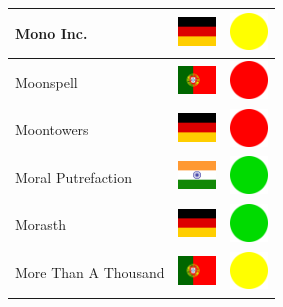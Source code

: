 \documentclass[12pt, a4paper, twoside]{report}
\begin{document}
\begin{center}
\begin{longtable}{|p{5cm}|p{2cm}|p{2cm}|}
Mono Inc. & \includegraphics[width=1cm]{4x3/de} & \includegraphics[width=1cm]{likes/m} \\ \hline
Moonspell & \includegraphics[width=1cm]{4x3/pt} & \includegraphics[width=1cm]{likes/n} \\ \hline
Moontowers & \includegraphics[width=1cm]{4x3/de} & \includegraphics[width=1cm]{likes/n} \\ \hline
Moral Putrefaction & \includegraphics[width=1cm]{4x3/in} & \includegraphics[width=1cm]{likes/y} \\ \hline
Morasth & \includegraphics[width=1cm]{4x3/de} & \includegraphics[width=1cm]{likes/y} \\ \hline
More Than A Thousand & \includegraphics[width=1cm]{4x3/pt} & \includegraphics[width=1cm]{likes/m} \\ \hline

\end{longtable}
\end{center}
\end{document}
